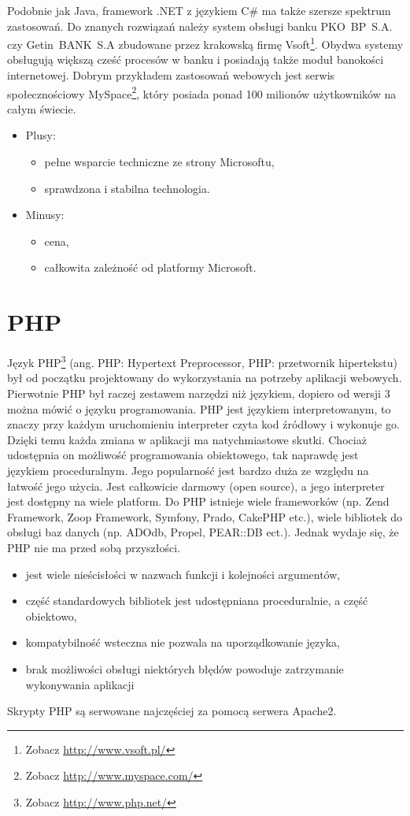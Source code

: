 \documentclass[a4paper,12pt,oneside]{report}
\begin{document}
Podobnie jak Java, framework .NET z językiem C\#  ma także szersze spektrum zastosowań. Do znanych rozwiązań należy system obsługi banku PKO~BP~S.A. czy Getin~BANK~S.A zbudowane przez krakowską firmę Vsoft\footnote{Zobacz \url{http://www.vsoft.pl/}}. Obydwa systemy obsługują większą cześć procesów w banku i posiadają także moduł banokości internetowej. Dobrym przykładem zastosowań webowych jest serwis społecznościowy MySpace\footnote{Zobacz \url{http://www.myspace.com/}}, który posiada ponad 100 milionów użytkowników na całym świecie.
\begin{itemize}
\item Plusy:
  \begin{itemize}
  \item pełne wsparcie techniczne ze strony Microsoftu,
  \item sprawdzona i stabilna technologia.
  \end{itemize}
\item Minusy:
  \begin{itemize}
  \item cena,
  \item całkowita zależność od platformy Microsoft.
  \end{itemize}
\end{itemize}

\section{PHP}
\label{sec:php}
Język PHP\footnote{Zobacz \url{http://www.php.net/}} (ang. PHP: Hypertext Preprocessor, PHP: przetwornik hipertekstu) był od początku projektowany do wykorzystania na potrzeby aplikacji webowych. Pierwotnie PHP był raczej zestawem narzędzi niż językiem, dopiero od wersji 3 można mówić o języku programowania. PHP jest językiem interpretowanym, to znaczy przy każdym uruchomieniu interpreter czyta kod źródłowy i wykonuje go. Dzięki temu każda zmiana w aplikacji ma natychmiastowe skutki. Chociaż udostępnia on możliwość programowania obiektowego, tak naprawdę jest językiem proceduralnym. Jego popularność jest bardzo duża ze względu na łatwość jego użycia. Jest całkowicie darmowy (open source), a jego interpreter jest dostępny na wiele platform. Do PHP istnieje wiele frameworków (np. Zend Framework, Zoop Framework, Symfony, Prado, CakePHP etc.), wiele bibliotek do obsługi baz danych (np. ADOdb, Propel, PEAR::DB ect.). Jednak wydaje się, że PHP nie ma przed sobą przyszłości. 
\begin{itemize}
  \item jest wiele nieścisłości w nazwach funkcji i kolejności argumentów,
  \item część standardowych bibliotek jest udostępniana proceduralnie, a część obiektowo,
  \item kompatybilność wsteczna nie pozwala na uporządkowanie języka,
  \item brak możliwości obsługi niektórych błędów powoduje zatrzymanie wykonywania aplikacji
\end{itemize}
Skrypty PHP są serwowane najczęściej za pomocą serwera Apache2.
\end{document}
